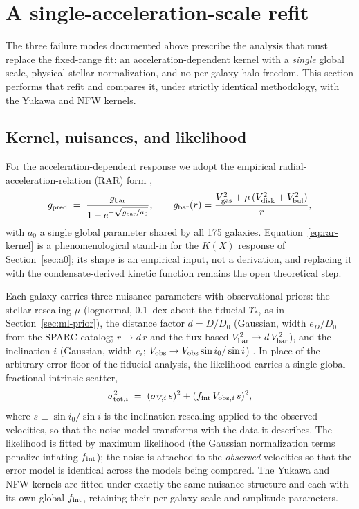 \documentclass[11pt,a4paper]{article}
\begin{document}
\section{A single-acceleration-scale refit}
\label{sec:refit}

The three failure modes documented above prescribe the analysis
that must replace the fixed-range fit: an acceleration-dependent
kernel with a \emph{single} global scale, physical stellar
normalization, and no per-galaxy halo freedom.  This section
performs that refit and compares it, under strictly identical
methodology, with the Yukawa and NFW kernels.

\subsection{Kernel, nuisances, and likelihood}

For the acceleration-dependent response we adopt the empirical
radial-acceleration-relation (RAR) form
\cite{McGaugh:2016leg},
\begin{equation}
g_{\rm pred} \;=\; \frac{g_{\rm bar}}{1 - e^{-\sqrt{g_{\rm bar}/a_0}}},
\qquad
g_{\rm bar}(r) = \frac{V_{\rm gas}^2 + \mu\,(V_{\rm disk}^2 + V_{\rm bul}^2)}{r},
\label{eq:rar-kernel}
\end{equation}
with $a_0$ a single global parameter shared by all 175 galaxies.
Equation~\eqref{eq:rar-kernel} is a phenomenological stand-in for
the $K(X)$ response of Section~\ref{sec:a0}; its shape is an
empirical input, not a derivation, and replacing it with the
condensate-derived kinetic function remains the open theoretical
step.

Each galaxy carries three nuisance parameters with observational
priors: the stellar rescaling $\mu$ (lognormal, 0.1~dex about the
fiducial $\Upsilon_*$, as in Section~\ref{sec:ml-prior}), the
distance factor $d = D/D_0$ (Gaussian, width $e_D/D_0$ from the
SPARC catalog; $r \to d\,r$ and the flux-based
$V_{\rm bar}^2 \to d\,V_{\rm bar}^2$), and the inclination $i$
(Gaussian, width $e_i$; $V_{\rm obs} \to V_{\rm obs}\sin i_0/\sin i$)
\cite{Li:2018tdo}.
In place of the arbitrary error floor of the fiducial analysis, the
likelihood carries a single global fractional intrinsic scatter,
\begin{equation}
\sigma_{{\rm tot},i}^2 \;=\; (\sigma_{V,i}\,s)^2
 + (f_{\rm int}\,V_{{\rm obs},i}\,s)^2 ,
\end{equation}
where $s \equiv \sin i_0/\sin i$ is the inclination rescaling
applied to the observed velocities, so that the noise model
transforms with the data it describes.  The likelihood is fitted by
maximum likelihood (the Gaussian normalization terms
penalize inflating $f_{\rm int}$); the noise is attached to the
\emph{observed} velocities so that the error model is identical
across the models being compared.
The Yukawa and NFW kernels are fitted under exactly the same
nuisance structure and each with its own global $f_{\rm int}$,
retaining their per-galaxy scale and amplitude parameters.
\end{document}
